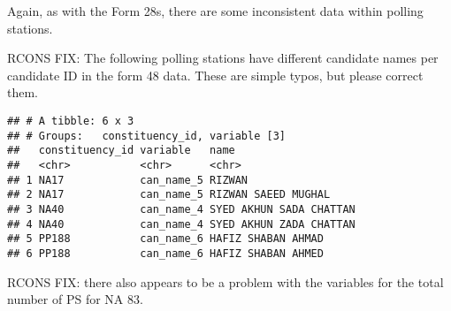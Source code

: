 \documentclass[]{article}
\newenvironment{Shaded}{\begin{snugshade}}{\end{snugshade}}
\newcommand{\DecValTok}[1]{\textcolor[rgb]{0.00,0.00,0.81}{#1}}
\newcommand{\KeywordTok}[1]{\textcolor[rgb]{0.13,0.29,0.53}{\textbf{#1}}}
\newcommand{\NormalTok}[1]{#1}
\newcommand{\OperatorTok}[1]{\textcolor[rgb]{0.81,0.36,0.00}{\textbf{#1}}}
\newcommand{\StringTok}[1]{\textcolor[rgb]{0.31,0.60,0.02}{#1}}
\begin{document}
Again, as with the Form 28s, there are some inconsistent data within
polling stations.

RCONS FIX: The following polling stations have different candidate names
per candidate ID in the form 48 data. These are simple typos, but please
correct them.

\begin{Shaded}
\end{Shaded}

\begin{verbatim}
## # A tibble: 6 x 3
## # Groups:   constituency_id, variable [3]
##   constituency_id variable   name                   
##   <chr>           <chr>      <chr>                  
## 1 NA17            can_name_5 RIZWAN                 
## 2 NA17            can_name_5 RIZWAN SAEED MUGHAL    
## 3 NA40            can_name_4 SYED AKHUN SADA CHATTAN
## 4 NA40            can_name_4 SYED AKHUN ZADA CHATTAN
## 5 PP188           can_name_6 HAFIZ SHABAN AHMAD     
## 6 PP188           can_name_6 HAFIZ SHABAN AHMED
\end{verbatim}

RCONS FIX: there also appears to be a problem with the variables for the
total number of PS for NA 83.

\begin{Shaded}
\end{Shaded}
\end{document}
